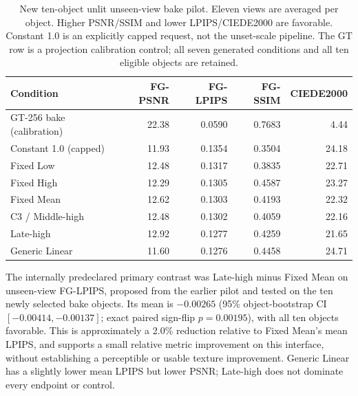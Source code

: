 \documentclass[times,twocolumn,final]{elsarticle}
\providecommand{\DIFadd}[1]{{\protect\color{blue} \sf #1}} %
\providecommand{\DIFaddbegin}{} %
\providecommand{\DIFaddend}{} %
\providecommand{\DIFaddFL}[1]{\DIFadd{#1}} %
\providecommand{\DIFaddbeginFL}{\DIFaddbegin} %
\providecommand{\DIFaddendFL}{\DIFaddend} %
\renewcommand{\DIFaddbeginFL}{}
\renewcommand{\DIFaddendFL}{}
\renewcommand{\DIFaddFL}[1]{#1}
\begin{document}
\begin{table}[ht]
\centering\scriptsize
\caption{New ten-object unlit unseen-view bake pilot. Eleven views are averaged per object. Higher PSNR/SSIM and lower LPIPS/CIEDE2000 are favorable. Constant 1.0 is an explicitly capped request, not the unset-scale pipeline. The GT row is a projection calibration control; all seven generated conditions and all ten eligible objects are retained.}
\label{tab:new-bake}
\begin{tabular}{lrrrr}
\toprule \DIFaddFL{Condition }& \DIFaddFL{FG-PSNR }& \DIFaddFL{FG-LPIPS }& \DIFaddFL{FG-SSIM }& \DIFaddFL{CIEDE2000 }\DIFaddendFL \\
\midrule
  \DIFaddbeginFL \DIFaddFL{GT-256 bake (calibration) }\DIFaddendFL &   \DIFaddbeginFL \DIFaddFL{22.38 }\DIFaddendFL &   \DIFaddbeginFL \DIFaddFL{0.0590 }\DIFaddendFL &   \DIFaddbeginFL \DIFaddFL{0.7683 }& \DIFaddFL{4.44 }\DIFaddendFL \\
  \DIFaddbeginFL \DIFaddFL{Constant 1.0 (capped) }\DIFaddendFL &   \DIFaddbeginFL \DIFaddFL{11.93 }\DIFaddendFL &   \DIFaddbeginFL \DIFaddFL{0.1354 }\DIFaddendFL &   \DIFaddbeginFL \DIFaddFL{0.3504 }& \DIFaddFL{24.18 }\DIFaddendFL \\
  \DIFaddbeginFL \DIFaddFL{Fixed Low }\DIFaddendFL &   \DIFaddbeginFL \DIFaddFL{12.48 }\DIFaddendFL &   \DIFaddbeginFL \DIFaddFL{0.1317 }\DIFaddendFL &   \DIFaddbeginFL \DIFaddFL{0.3835 }& \DIFaddFL{22.71 }\\
\DIFaddFL{Fixed High }& \DIFaddFL{12.29 }& \DIFaddFL{0.1305 }& \DIFaddFL{0.4587 }& \DIFaddFL{23.27 }\\
\DIFaddFL{Fixed Mean }& \DIFaddFL{12.62 }& \DIFaddFL{0.1303 }& \DIFaddFL{0.4193 }& \DIFaddFL{22.32 }\\
\DIFaddFL{C3 / Middle-high }& \DIFaddFL{12.48 }& \DIFaddFL{0.1302 }& \DIFaddFL{0.4059 }& \DIFaddFL{22.16 }\\
\DIFaddFL{Late-high }& \DIFaddFL{12.92 }& \DIFaddFL{0.1277 }& \DIFaddFL{0.4259 }& \DIFaddFL{21.65 }\\
\DIFaddFL{Generic Linear }& \DIFaddFL{11.60 }& \DIFaddFL{0.1276 }& \DIFaddFL{0.4458 }& \DIFaddFL{24.71 }\DIFaddendFL \\
\bottomrule\end{tabular}
\end{table}

  \DIFaddbegin \DIFadd{The internally predeclared primary contrast was Late-high minus Fixed Mean on unseen-view FG-LPIPS, proposed from the earlier pilot and tested on the ten newly selected bake objects. Its mean is $-0.00265$ (95\% object-bootstrap CI $[-0.00414,-0.00137]$; exact paired sign-flip $p=0.00195$), with all ten objects favorable. This is approximately a 2.0\% reduction relative to Fixed Mean's mean LPIPS, }\DIFaddend and   \DIFaddbegin \DIFadd{supports a small relative metric improvement on this interface, without establishing a perceptible or usable texture improvement. Generic Linear has a slightly lower mean LPIPS but lower PSNR; Late-high does not dominate every endpoint or control.
}
\end{document}
